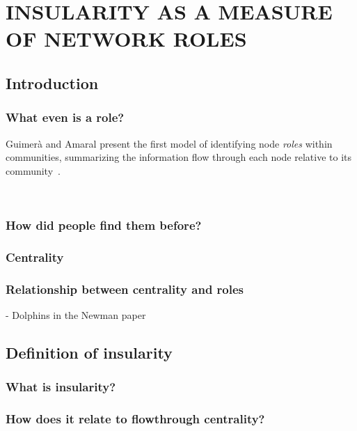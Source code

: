 \chapter{INSULARITY AS A MEASURE OF NETWORK ROLES} \label{ch:insularity}%

\section{Introduction}

\subsection{What even is a role?}

Guimer\`{a} and Amaral present the first model of identifying  node \emph{roles} within communities, summarizing the information flow through each node relative to its community~\cite{guimera2005functional}.

~\cite{costa2007characterization}

\subsection{How did people find them before?}

\subsection{Centrality}

\subsection{Relationship between centrality and roles}

- Dolphins in the Newman paper

\section{Definition of insularity}

\subsection{What is insularity?}

\subsection{How does it relate to flowthrough centrality?}

